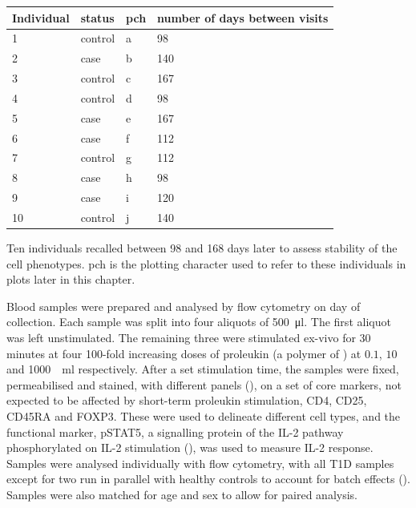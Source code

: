 \begin{table}[ht]
\centering
\begin{tabular}{llll}
  \hline
Individual & status  & pch & number of days between visits \\
  \hline
1          & control & a   & 98 \\
2          & case    & b   & 140 \\
3          & control & c   & 167 \\
4          & control & d   & 98 \\
5          & case    & e   & 167 \\
6          & case    & f   & 112 \\
7          & control & g   & 112 \\
8          & case    & h   & 98 \\
9          & case    & i   & 120 \\
10         & control & j   & 140 \\
   \hline
\end{tabular}
{Ten individuals recalled between 98 and 168 days later to assess stability of the cell phenotypes. }
{
pch is the plotting character used to refer to these individuals in plots later in this chapter.
}
\end{table}
Blood samples were prepared and analysed by flow cytometry on day of collection.
Each sample was split into four aliquots of \SI{500}{\micro\litre}.
The first aliquot was left unstimulated.
The remaining three were stimulated ex-vivo for 30 minutes at four 100-fold increasing doses
of proleukin (a polymer of ) at $0.1$, $10$ and \SI{1000}{\unit\per\milli\litre} respectively.
After a set stimulation time, the samples were fixed, permeabilised and stained, with different panels (), 
on a set of core markers, not expected to be affected by short-term proleukin stimulation,
CD4, CD25, CD45RA and FOXP3.
These were used to delineate different cell types, and the functional marker, pSTAT5,
a signalling protein of the IL-2 pathway phosphorylated on IL-2 stimulation (),
was used to measure IL-2 response.
Samples were analysed individually with flow cytometry, with all \gls{T1D} samples except for two run in parallel with healthy controls
to account for batch effects ().
Samples were also matched for age and sex to allow for paired analysis.

